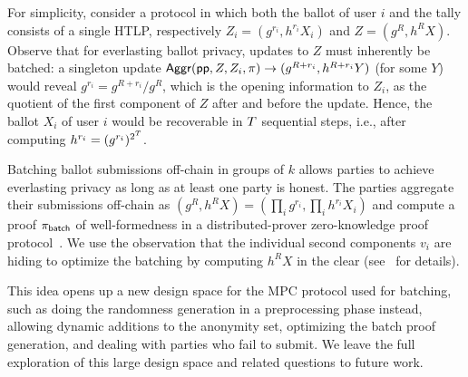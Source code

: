For simplicity, consider a protocol in which both the ballot of user $i$ and the tally consists of a single HTLP, respectively $Z_i=(g^{r_i},h^{r_i}X_i)$ and $Z = (g^R, h^R X)$. Observe that for everlasting ballot privacy, updates to $Z$ must inherently be batched: a singleton update $\mathsf{Aggr}(\mathsf{pp}, Z, Z_i, \pi) \to (g^{R+r_i}, h^{R+r_i} Y)$ (for some $Y$) would reveal $g^{r_i} = g^{R+r_i}/g^R$, which is the opening information to $Z_i$, as the quotient of the first component of $Z$ after and before the update. Hence, the ballot $X_i$ of user $i$ would be recoverable in $T$ sequential steps, i.e., after computing $h^{r_i}=(g^{r_i})^{2^{T}}$.

Batching ballot submissions off-chain in groups of $k$ allows parties to achieve everlasting privacy as long as at least one party is honest. 
The parties aggregate their submissions off-chain as $(g^R, h^R X) = (\prod_i g^{r_i}, \prod_i h^{r_i} X_i)$ and compute a proof $\pi_{\sf batch}$ of well-formedness in a distributed-prover zero-knowledge proof protocol~\cite{PoPETS:DPPSV22}. We use the observation that the individual second components $v_i$ are hiding to optimize the batching by computing $h^R X$ in the clear
(see~ for details).



This idea opens up a new design space for the MPC protocol used for batching, such as doing the randomness generation in a preprocessing phase instead, allowing dynamic additions to the anonymity set, optimizing the batch proof generation, and dealing with parties who fail to submit. We leave the full exploration of this large design space and related questions to future work.


